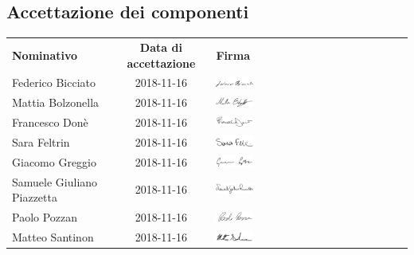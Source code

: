 \subsection{Accettazione dei componenti}
\begin{table}[H]
	\centering\renewcommand{\arraystretch}{1.5}
	
	\begin{tabular}{l c M{0.35\textwidth}}
		
		
		\rowcolorhead 
		{ \textbf{Nominativo}} &
		{ \textbf{Data di accettazione}} &
		{ \textbf{Firma}}  \\
		
		\rowcolorlight
		Federico Bicciato & 2018-11-16 &   	\includegraphics[width=0.2\textwidth]{res/images/firme/federico.png}\\  
		\rowcolordark
		Mattia Bolzonella & 2018-11-16 &     	\includegraphics[width=0.2\textwidth]{res/images/firme/mattia.png}\\  
		\rowcolorlight
		Francesco Donè & 2018-11-16 &   	\includegraphics[width=0.2\textwidth]{res/images/firme/francesco.png}\\  
		\rowcolordark
		Sara Feltrin & 2018-11-16 &   	\includegraphics[width=0.2\textwidth]{res/images/firme/sara.png}\\  
		\rowcolorlight
		Giacomo Greggio & 2018-11-16 &   	\includegraphics[width=0.2\textwidth]{res/images/firme/giacomo.png}\\ 
		\rowcolordark
		Samuele Giuliano Piazzetta & 2018-11-16 &   	\includegraphics[width=0.2\textwidth]{res/images/firme/samuele.png}\\  
		\rowcolorlight
		Paolo Pozzan & 2018-11-16 &   	\includegraphics[width=0.2\textwidth]{res/images/firme/paolo.png}\\ 
		\rowcolordark
		Matteo Santinon & 2018-11-16 &   	\includegraphics[width=0.2\textwidth]{res/images/firme/matteo.png}\\ 
	\end{tabular}
\end{table}

